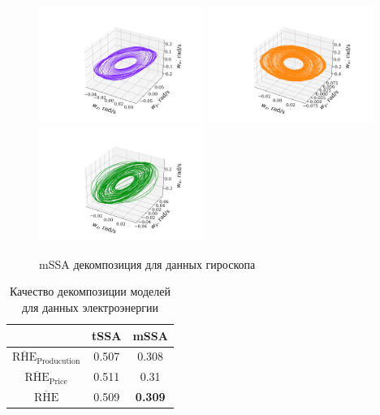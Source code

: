 			\begin{figure}[h]
				\centering
				\includegraphics[width=0.48\textwidth, keepaspectratio]{../experiments/motion_1/mssa/figs/decomposition/manual/grouping_2/gyro_1.png}
				\includegraphics[width=0.48\textwidth, keepaspectratio]{../experiments/motion_1/mssa/figs/decomposition/manual/grouping_2/gyro_2.png}
				\includegraphics[width=0.48\textwidth, keepaspectratio]{../experiments/motion_1/mssa/figs/decomposition/manual/grouping_2/gyro_3.png}
				\caption{mSSA декомпозиция для данных гироскопа}\label{fig:gyro_decomp_mssa}
			\end{figure}
			
			\def\arraystretch{1.2}
			\begin{table}[h!]
				\centering
				\caption{Качество декомпозиции моделей для данных электроэнергии}\label{tab:decomp_electr_results}
				\begin{tabular}{|c|c|c|}
					\hline
					& tSSA  & mSSA           \\ \hline
					$ \overline{\text{RHE}}_{\text{Producution}} $  & 0.507 & 0.308          \\ \hline
					$ \overline{\text{RHE}}_{\text{Price}} $      & 0.511 & 0.31           \\ \hline
					$ \overline{\text{RHE}} $             & 0.509 & \textbf{0.309} \\ \hline
				\end{tabular}
			\end{table}
			
